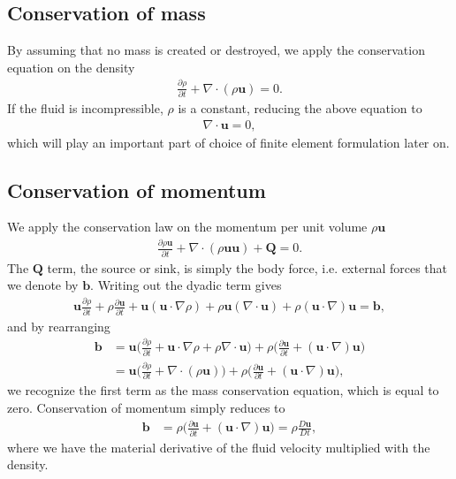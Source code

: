 \documentclass[a4paper,10pt]{article}
\renewcommand{\vec}[1]{\mathbf{#1}}
\renewcommand{\(}{\left(}
\renewcommand{\)}{\right)}
\newcommand{\dpart}[2]{\frac{\partial#1}{\partial#2}}
\begin{document}
\subsection{Conservation of mass}
By assuming that no mass is created or destroyed, we apply the conservation equation on the density
\begin{align*}
  \dpart{\rho}{t} + \nabla \cdot (\rho\vec u) = 0.
\end{align*}
If the fluid is incompressible, $\rho$ is a constant, reducing the above equation to
\begin{align}
  \label{eq:incompressible_fluid}
  \nabla \cdot \vec u = 0,
\end{align}
which will play an important part of choice of finite element formulation later on.

\subsection{Conservation of momentum}
We apply the conservation law on the momentum per unit volume $\rho\vec u$
\begin{align*}
  \dpart{\rho\vec u}{t} + \nabla \cdot (\rho\vec u\vec u) + \vec Q = 0.
\end{align*}
The $\vec Q$ term, the source or sink, is simply the body force, i.e. external forces that we denote by $\vec b$. Writing out the dyadic term gives
\begin{align*}
  \vec u\dpart{\rho}{t} + \rho\dpart{\vec u}{t} + \vec u(\vec u\cdot\nabla \rho) + \rho\vec u(\nabla\cdot \vec u) + \rho(\vec u\cdot \nabla) \vec u = \vec b,
\end{align*}
and by rearranging
\begin{align*}
  \vec b &= \vec u\Big(\dpart{\rho}{t} + \vec u\cdot \nabla \rho + \rho\nabla \cdot \vec u \Big) + \rho\Big( \dpart{\vec u}{t} + (\vec u\cdot \nabla) \vec u \Big)\\
  &= \vec u\Big(\dpart{\rho}{t} + \nabla\cdot(\rho\vec u) \Big) + \rho\Big( \dpart{\vec u}{t} + (\vec u\cdot \nabla) \vec u \Big),
\end{align*}
we recognize the first term as the mass conservation equation, which is equal to zero. Conservation of momentum simply reduces to
\begin{align*}
  \vec b &= \rho\Big( \dpart{\vec u}{t} + (\vec u\cdot \nabla) \vec u \Big) = \rho\frac{D\vec u}{Dt},
\end{align*}
where we have the material derivative of the fluid velocity multiplied with the density.
\end{document}
